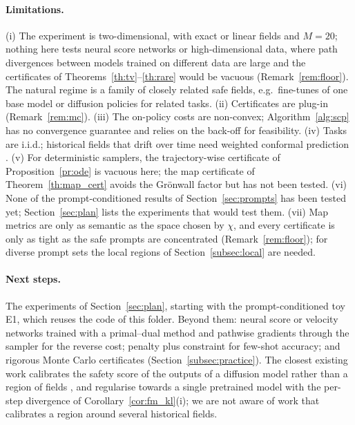 \documentclass{article}
\theoremstyle{plain}
\begin{document}
\paragraph{Limitations.}
(i) The experiment is two-dimensional, with exact or linear fields and $M=20$; nothing here tests
neural score networks or high-dimensional data, where path divergences between models trained on
different data are large and the certificates of Theorems~\ref{th:tv}--\ref{th:rare} would be
vacuous (Remark~\ref{rem:floor}). The natural regime is a family of closely related safe fields,
e.g.\ fine-tunes of one base model or diffusion policies for related tasks. (ii) Certificates are
plug-in (Remark~\ref{rem:mc}). (iii) The on-policy costs are non-convex; Algorithm~\ref{alg:scp} has
no convergence guarantee and relies on the back-off for feasibility. (iv) Tasks are i.i.d.;
historical fields that drift over time need weighted conformal prediction
\citep{barber2023conformal}. (v) For deterministic samplers, the trajectory-wise certificate of
Proposition~\ref{pr:ode} is vacuous here; the map certificate of Theorem~\ref{th:map_cert} avoids the
Gr\"onwall factor but has not been tested. (vi) None of the prompt-conditioned results of
Section~\ref{sec:prompts} has been tested yet; Section~\ref{sec:plan} lists the experiments that would
test them. (vii) Map metrics are only as semantic as the space chosen by $\chi$, and every certificate is
only as tight as the safe prompts are concentrated (Remark~\ref{rem:floor}); for diverse prompt sets the
local regions of Section~\ref{subsec:local} are needed.

\paragraph{Next steps.}
The experiments of Section~\ref{sec:plan}, starting with the prompt-conditioned toy E1, which reuses the
code of this folder. Beyond them: neural score or velocity networks trained with a primal--dual method
and pathwise gradients through the sampler for the reverse cost; penalty plus constraint for few-shot
accuracy; and rigorous Monte Carlo certificates (Section~\ref{subsec:practice}). The closest existing work calibrates the safety score of the outputs
of a diffusion model rather than a region of fields \citep{hu2025uncertain}, and
\citet{fan2023dpok} regularise towards a single pretrained model with the per-step divergence of
Corollary~\ref{cor:fm_kl}(i); we are not aware of work that calibrates a region around several
historical fields.
\end{document}
